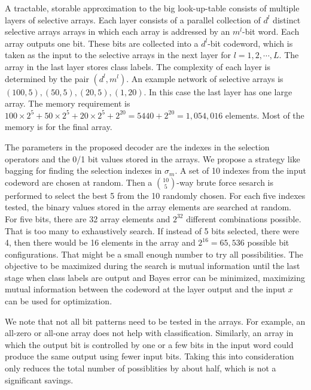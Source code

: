 \documentclass{article}
\begin{document}
A tractable, storable approximation to the big look-up-table consists of multiple layers of selective arrays.  Each layer consists of a parallel collection of $d^l$ distinct selective arrays
arrays in which each array is addressed by an $m^l$-bit word.  Each array outputs one bit.  These bits are collected into a $d^l$-bit codeword, which is taken as the input to the selective arrays in the next layer for $l=1, 2, \cdots, L$.  The array in the last layer stores class labels.  The complexity of each layer is determined by the pair $(d^l,m^l)$.  An example network of selective arrays is $(100,5), (50,5), (20,5), (1,20)$.  In this case the last layer has one large array.  The memory requirement is $100 \times 2^5 + 50 \times 2^5 + 20 \times 2^5 + 2^{20} = 5440 + 2^{20} = 1,054,016$ elements.  Most of the memory is for the final array.

The parameters in the proposed decoder are the indexes in the selection operators and the 0/1 bit values stored in the arrays.  We propose a strategy like bagging for finding the selection indexes in $\sigma_m$.  A set of 10 indexes from the input codeword are chosen at random.  Then a ${10 \choose 5}$-way brute force sesarch is performed to select the best 5 from the 10 randomly chosen.  For each five indexes tested, the binary values stored in the array elements are searched at random.  For five bits, there are 32 array elements and $2^{32}$ different combinations possible.  That is too many to exhaustively search.  If instead of 5 bits selected, there were 4, then there would be 16 elements in the array and $2^{16}=65,536$ possible bit configurations.  That might be a small enough number to try all possibilities.  The objective to be maximized during the search is mutual information until the last stage when class labels are output and Bayes error can be minimized, maximizing mutual information between the codeword at the layer output and the input $x$ can be used for optimization.

We note that not all bit patterns need to be tested in the arrays.  For example, an all-zero or all-one array does not help with classification.  Similarly, an array in which the output bit is controlled by one or a few bits in the input word could produce the same output using fewer input bits.  Taking this into consideration only reduces the total number of possiblities by about half, which is not a significant savings.
\end{document}
